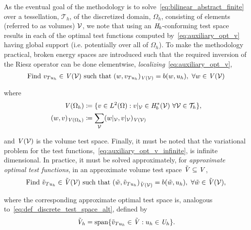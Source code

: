 As the eventual goal of the methodology is to solve~\eqref{eq:bilinear_abstract_finite} over a tessellation,
$\mathcal{T}_h$, of the discretized domain, $\Omega_h$, consisting of elements (referred to as volumes) $\mathcal{{{V}}}$, we
note that using an $\mathit{{{H}}}_b$-conforming test space results in each of the optimal test functions computed
by~\eqref{eq:auxiliary_opt_v} having global support (i.e. potentially over all of $\Omega_h$).  To make the methodology
practical, broken energy spaces are introduced such that the required inversion of the Riesz operator can be done
elementwise, \emph{localizing}~\eqref{eq:auxiliary_opt_v},
\begin{align} \label{eq:auxiliary_opt_v_infinite}
\text{Find}\ v_{T u_h} \in \mathit{{{V}}}(\mathcal{{{V}}})\ \text{such that}\
(w,v_{T u_h})_{\mathit{{{V}}}(\mathcal{{{V}}})} = b(w,u_h),\ \forall w \in \mathit{{{V}}}(\mathcal{{{V}}})
\end{align}

where 
\begin{align}
\mathit{{{V}}}(\Omega_h) 
&\coloneqq
\{ v \in L^2(\Omega) : v|_{\mathcal{{{V}}}} \in \mathit{{{H}}}_b^*(\mathcal{{{V}}})\ \forall \mathcal{{{V}}} \in \mathcal{T}_h \}, \\
(w,v)_{\mathit{{{V}}}(\Omega_h)}
&\coloneqq
\sum_{\mathcal{{{V}}}} (w|_{\mathcal{{{V}}}},v|_{\mathcal{{{V}}}})_{\mathit{{{V}}}(\mathcal{{{V}}})}
\end{align}

and $\mathit{{{V}}}(\mathcal{{{V}}})$ is the volume test space. Finally, it must be noted that the variational problem for the test
functions,~\eqref{eq:auxiliary_opt_v_infinite}, is infinite dimensional. In practice, it must be solved approximately, for
\textit{approximate optimal test functions}, in an approximate volume test space $\tilde{\mathit{{{V}}}} \subseteq \mathit{{{V}}}$,
\begin{align} \label{eq:auxiliary_opt_v_finite}
\text{Find}\ \tilde{v}_{T u_h} \in \afspace{V}(\fe{V})\ \text{such that}\
(\tilde{w},\tilde{v}_{T u_h})_{\afspace{V}(\fe{V})} = b(\tilde{w},u_h),\ \forall \tilde{w} \in \afspace{V}(\fe{V}),
\end{align}

where the corresponding approximate optimal test space is, analogous to~\eqref{eq:def_discrete_test_space_alt}, defined by
\begin{align} \label{eq:def_discrete_test_space_alt_approx}
\tilde{\mathit{{{V}}}}_h = {\text{span} \{ \tilde{v}_{T u_h} \in \tilde{\mathit{{{V}}}} : u_h \in \mathit{{{U}}}_h \} }.
\end{align}


